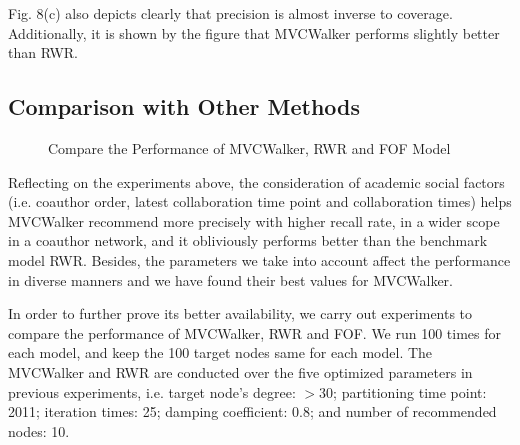 \documentclass[10pt,journal,compsoc]{IEEEtran}
\begin{document}
Fig. 8(c) also depicts clearly that precision is almost inverse to coverage. Additionally, it is shown by the figure that MVCWalker performs slightly better than RWR.

\subsection{Comparison with Other Methods}

\begin{figure}
{}
\caption{Compare the Performance of MVCWalker, RWR and FOF Model}
\label{fig:9}       %
\end{figure}

Reflecting on the experiments above, the consideration of academic social factors (i.e. coauthor order, latest collaboration time point and collaboration times) helps MVCWalker recommend more precisely with higher recall rate, in a wider scope in a coauthor network, and it obliviously performs better than the benchmark model RWR. Besides, the parameters we take into account affect the performance in diverse manners and we have found their best values for MVCWalker.

In order to further prove its better availability, we carry out experiments to compare the performance of MVCWalker, RWR and FOF. We run 100 times for each model, and keep the 100 target nodes same for each model. The MVCWalker and RWR are conducted over the five optimized parameters in previous experiments, i.e. target node's degree: $>30$; partitioning time point: 2011; iteration times: 25; damping coefficient: 0.8; and number of recommended nodes: 10.
\end{document}
